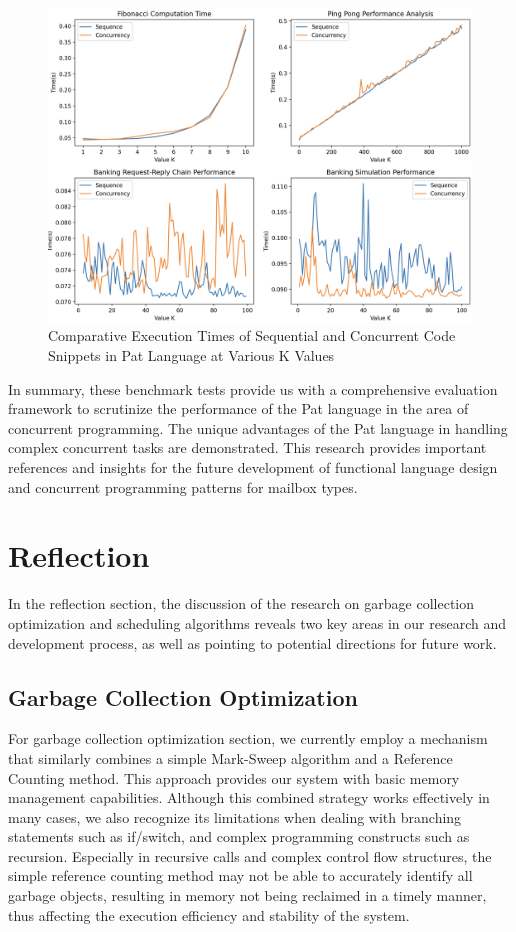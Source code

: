 \documentclass{l4proj}
\begin{document}
\begin{figure}
    \centering
    \includegraphics[width=0.9\linewidth]{dissertation/images/benchmark.png}    
    \caption{ 
    Comparative Execution Times of Sequential and Concurrent Code Snippets in Pat Language at Various K Values
    }
    \label{fig:benchmark} 
\end{figure}

In summary, these benchmark tests provide us with a comprehensive evaluation framework to scrutinize the performance of the Pat language in the area of concurrent programming. The unique advantages of the Pat language in handling complex concurrent tasks are demonstrated. This research provides important references and insights for the future development of functional language design and concurrent programming patterns for mailbox types.

\section{Reflection}
In the reflection section, the discussion of the research on garbage collection optimization and scheduling algorithms reveals two key areas in our research and development process, as well as pointing to potential directions for future work.

\subsection{Garbage Collection Optimization}

For garbage collection optimization section, we currently employ a mechanism that similarly combines a simple Mark-Sweep algorithm and a Reference Counting method. This approach provides our system with basic memory management capabilities. Although this combined strategy works effectively in many cases, we also recognize its limitations when dealing with branching statements such as if/switch, and complex programming constructs such as recursion. Especially in recursive calls and complex control flow structures, the simple reference counting method may not be able to accurately identify all garbage objects, resulting in memory not being reclaimed in a timely manner, thus affecting the execution efficiency and stability of the system.
\end{document}
